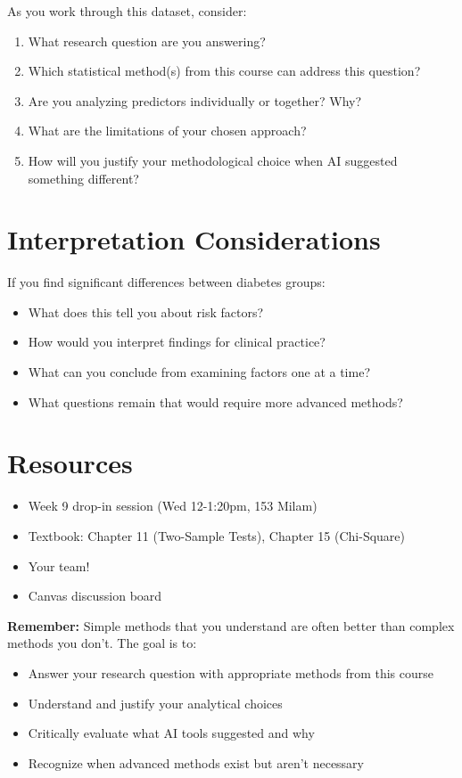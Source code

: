 \documentclass[11pt]{article}
\begin{document}
As you work through this dataset, consider:

\begin{enumerate}
\item What research question are you answering?
\item Which statistical method(s) from this course can address this question?
\item Are you analyzing predictors individually or together? Why?
\item What are the limitations of your chosen approach?
\item How will you justify your methodological choice when AI suggested something different?
\end{enumerate}

\section*{Interpretation Considerations}

If you find significant differences between diabetes groups:
\begin{itemize}
\item What does this tell you about risk factors?
\item How would you interpret findings for clinical practice?
\item What can you conclude from examining factors one at a time?
\item What questions remain that would require more advanced methods?
\end{itemize}

\section*{Resources}

\begin{itemize}
\item Week 9 drop-in session (Wed 12-1:20pm, 153 Milam)
\item Textbook: Chapter 11 (Two-Sample Tests), Chapter 15 (Chi-Square)
\item Your team!
\item Canvas discussion board
\end{itemize}

\vspace{0.5cm}

\begin{tcolorbox}[colback=gray!10,colframe=gray!50,boxrule=1pt,arc=2pt]
\textbf{Remember:} Simple methods that you understand are often better than complex methods you don't. The goal is to:
\begin{itemize}
\item Answer your research question with appropriate methods from this course
\item Understand and justify your analytical choices
\item Critically evaluate what AI tools suggested and why
\item Recognize when advanced methods exist but aren't necessary
\end{itemize}
\end{tcolorbox}
\end{document}
